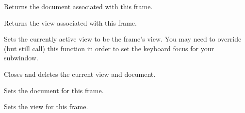 

Returns the document associated with this frame.



Returns the view associated with this frame.



Sets the currently active view to be the frame's view. You may need
to override (but still call) this function in order to set the keyboard
focus for your subwindow.



Closes and deletes the current view and document.



Sets the document for this frame.



Sets the view for this frame.


